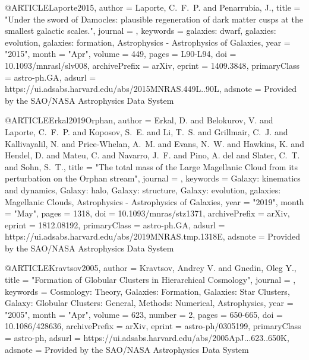 \documentclass[apj]{emulateapj}
\begin{document}
{{{{@ARTICLE{Laporte2015,
       author = {{Laporte}, C.~F.~P. and {Penarrubia}, J.},
        title = "{Under the sword of Damocles: plausible regeneration of dark matter cusps at the smallest galactic scales.}",
      journal = {\mnras},
     keywords = {galaxies: dwarf, galaxies: evolution, galaxies: formation, Astrophysics - Astrophysics of Galaxies},
         year = "2015",
        month = "Apr",
       volume = {449},
        pages = {L90-L94},
          doi = {10.1093/mnrasl/slv008},
archivePrefix = {arXiv},
       eprint = {1409.3848},
 primaryClass = {astro-ph.GA},
       adsurl = {https://ui.adsabs.harvard.edu/abs/2015MNRAS.449L..90L},
      adsnote = {Provided by the SAO/NASA Astrophysics Data System}
}




@ARTICLE{Erkal2019Orphan,
       author = {{Erkal}, D. and {Belokurov}, V. and {Laporte}, C.~F.~P. and
         {Koposov}, S.~E. and {Li}, T.~S. and {Grillmair}, C.~J. and
         {Kallivayalil}, N. and {Price-Whelan}, A.~M. and {Evans}, N.~W. and
         {Hawkins}, K. and {Hendel}, D. and {Mateu}, C. and {Navarro}, J.~F. and
         {Pino}, A. del and {Slater}, C.~T. and {Sohn}, S.~T.},
        title = "{The total mass of the Large Magellanic Cloud from its perturbation on the Orphan stream}",
      journal = {\mnras},
     keywords = {Galaxy: kinematics and dynamics, Galaxy: halo, Galaxy: structure, Galaxy: evolution, galaxies: Magellanic Clouds, Astrophysics - Astrophysics of Galaxies},
         year = "2019",
        month = "May",
        pages = {1318},
          doi = {10.1093/mnras/stz1371},
archivePrefix = {arXiv},
       eprint = {1812.08192},
 primaryClass = {astro-ph.GA},
       adsurl = {https://ui.adsabs.harvard.edu/abs/2019MNRAS.tmp.1318E},
      adsnote = {Provided by the SAO/NASA Astrophysics Data System}
}


@ARTICLE{Kravtsov2005,
       author = {{Kravtsov}, Andrey V. and {Gnedin}, Oleg Y.},
        title = "{Formation of Globular Clusters in Hierarchical Cosmology}",
      journal = {\apj},
     keywords = {Cosmology: Theory, Galaxies: Formation, Galaxies: Star Clusters, Galaxy: Globular Clusters: General, Methods: Numerical, Astrophysics},
         year = "2005",
        month = "Apr",
       volume = {623},
       number = {2},
        pages = {650-665},
          doi = {10.1086/428636},
archivePrefix = {arXiv},
       eprint = {astro-ph/0305199},
 primaryClass = {astro-ph},
       adsurl = {https://ui.adsabs.harvard.edu/abs/2005ApJ...623..650K},
      adsnote = {Provided by the SAO/NASA Astrophysics Data System}
}




}}}}
\end{document}
